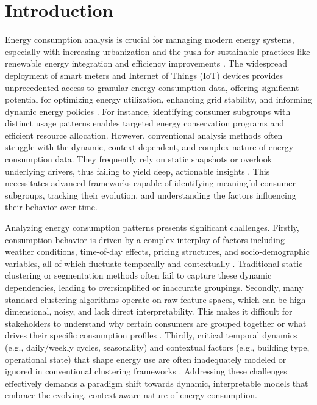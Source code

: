 \documentclass[final,authoryear,3p,times,review,sort&compress]{elsarticle}
\begin{document}
\section{Introduction}
\label{sec:intr}
Energy consumption analysis is crucial for managing modern energy systems, especially with increasing urbanization and the push for sustainable practices like renewable energy integration and efficiency improvements \citep{yang2024sustainability}. The widespread deployment of smart meters and Internet of Things (IoT) devices provides unprecedented access to granular energy consumption data, offering significant potential for optimizing energy utilization, enhancing grid stability, and informing dynamic energy policies \citep{jabbar2022smart}. For instance, identifying consumer subgroups with distinct usage patterns enables targeted energy conservation programs and efficient resource allocation. However, conventional analysis methods often struggle with the dynamic, context-dependent, and complex nature of energy consumption data. They frequently rely on static snapshots or overlook underlying drivers, thus failing to yield deep, actionable insights \citep{biscarri2017electricity,ruiz2018energy}. This necessitates advanced frameworks capable of identifying meaningful consumer subgroups, tracking their evolution, and understanding the factors influencing their behavior over time.

Analyzing energy consumption patterns presents significant challenges. Firstly, consumption behavior is driven by a complex interplay of factors including weather conditions, time-of-day effects, pricing structures, and socio-demographic variables, all of which fluctuate temporally and contextually \citep{huuki2024house}. Traditional static clustering or segmentation methods often fail to capture these dynamic dependencies, leading to oversimplified or inaccurate groupings. Secondly, many standard clustering algorithms operate on raw feature spaces, which can be high-dimensional, noisy, and lack direct interpretability. This makes it difficult for stakeholders to understand why certain consumers are grouped together or what drives their specific consumption profiles \citep{kallel2025clustering}. Thirdly, critical temporal dynamics (e.g., daily/weekly cycles, seasonality) and contextual factors (e.g., building type, operational state) that shape energy use are often inadequately modeled or ignored in conventional clustering frameworks \citep{bandoria2025enhancing}. Addressing these challenges effectively demands a paradigm shift towards dynamic, interpretable models that embrace the evolving, context-aware nature of energy consumption.
\end{document}

